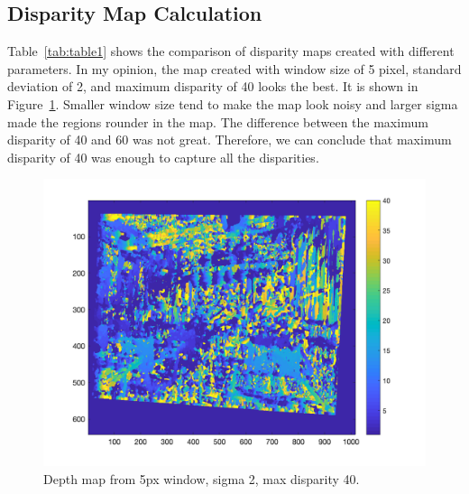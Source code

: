 \subsection{Disparity Map Calculation}
Table~\ref{tab:table1} shows the comparison of disparity maps created with different parameters. In my opinion, the map created with window size of 5 pixel, standard deviation of 2, and maximum disparity of 40 looks the best. It is shown in Figure~\ref{fig:best_map}. Smaller window size tend to make the map look noisy and larger sigma made the regions rounder in the map. The difference between the maximum disparity of 40 and 60 was not great. Therefore, we can conclude that maximum disparity of 40 was enough to capture all the disparities.

\begin{figure}[h!]
	\centering
	\includegraphics[width=\textwidth]{../code/win5sig2.png}
	\caption{Depth map from 5px window, sigma 2, max disparity 40.}
	\label{fig:best_map}
\end{figure}

